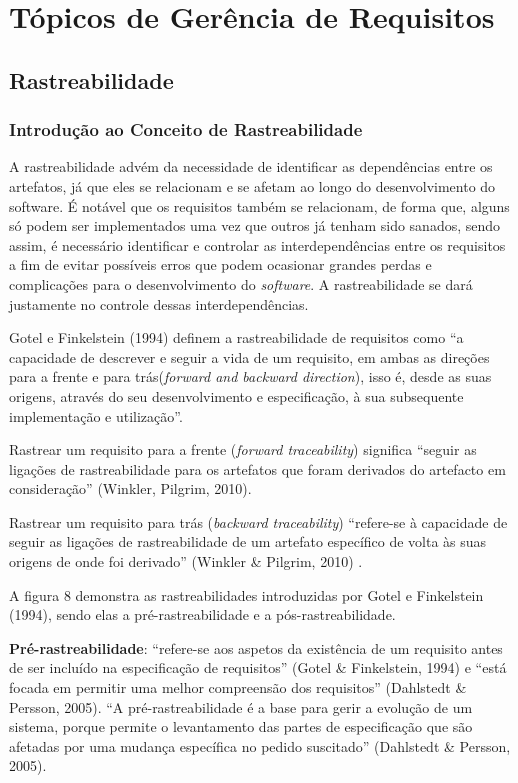 \chapter{Tópicos de Gerência de Requisitos}
\label{management}

\section{Rastreabilidade}

\subsection{Introdução ao Conceito de Rastreabilidade}

A rastreabilidade advém da necessidade de identificar as dependências entre os artefatos, já que eles se relacionam e se afetam ao longo do desenvolvimento do software. É notável que os requisitos também se relacionam, de forma que, alguns só podem ser implementados uma vez que outros já tenham sido sanados, sendo assim, é necessário identificar e controlar as interdependências entre os requisitos a fim de evitar possíveis erros que podem ocasionar grandes perdas e complicações para o desenvolvimento do \textit{software}. A rastreabilidade se dará justamente no controle dessas interdependências.

Gotel e Finkelstein (1994) definem a rastreabilidade de requisitos como “a capacidade de descrever e seguir a vida de um requisito, em ambas as direções para a frente e para trás(\textit{forward and backward direction}), isso é, desde as suas origens, através do seu desenvolvimento e especificação, à sua subsequente implementação e utilização”.

Rastrear um requisito para a frente (\textit{forward traceability}) significa “seguir as ligações de rastreabilidade para os artefatos que foram derivados do artefacto em consideração” (Winkler, Pilgrim, 2010).

Rastrear um requisito para trás (\textit{backward traceability}) “refere-se à capacidade de seguir as ligações de rastreabilidade de um artefato específico de volta às suas origens de onde foi derivado” (Winkler \& Pilgrim, 2010) .

A figura 8 demonstra as rastreabilidades introduzidas por Gotel e Finkelstein (1994), sendo elas a pré-rastreabilidade e a pós-rastreabilidade.

\textbf{Pré-rastreabilidade}: “refere-se aos aspetos da existência de um requisito antes de ser incluído na especificação de requisitos” (Gotel \& Finkelstein, 1994) e “está focada em permitir uma melhor compreensão dos requisitos” (Dahlstedt \& Persson, 2005). “A pré-rastreabilidade é a base para gerir a evolução de um sistema, porque permite o levantamento das partes de especificação que são afetadas por uma mudança específica no pedido suscitado” (Dahlstedt \& Persson, 2005).

